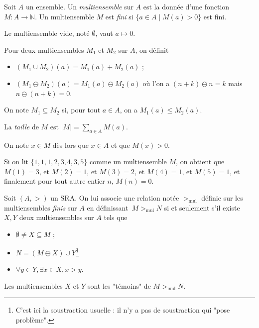 \documentclass[../main]{subfiles}
\begin{document}
  \begin{defn}
    Soit $A$ un ensemble. Un \textit{multiensemble} sur $A$ est la donnée d'une fonction $M : A \to \mathds{N}$.
    Un multiensemble $M$ est \textit{fini} si $\{a \in A  \mid M(a) > 0\}$ est fini.

    Le multiensemble vide, noté $\emptyset$, vaut $a \mapsto 0$.

    Pour deux multiensembles $M_1$ et $M_2$ sur $A$, on définit 
    \begin{itemize}
      \item  $(M_1 \cup M_2)(a) = M_1(a) + M_2(a)$ ;
      \item $(M_1 \ominus M_2)(a) = M_1(a) \ominus M_2(a)$ où l'on a $(n + k)\ominus n = k$ mais $n \ominus (n + k) = 0$.
    \end{itemize}

    On note $M_1 \subseteq M_2$ si, pour tout $a \in A$, on a $M_1(a) \le M_2(a)$.

    La \textit{taille} de $M$ est $|M| = \sum_{a \in A} M(a)$.

    On note $x \in M$ dès lors que $x \in A$ et que $M(x) > 0$.
  \end{defn}

  \begin{exm}
    Si on lit $\{1, 1, 1, 2, 3, 4, 3, 5\}$ comme un multiensemble $M$, on obtient que $M(1) = 3$, et $M(2) = 1$, et $M(3) = 2$, et $M(4) = 1$, et $M(5) = 1$, et finalement pour tout autre entier  $n$, $M(n) = 0$.
  \end{exm}

  \begin{defn}
    Soit $(A, >)$ un SRA.
    On lui associe une relation notée  $>_\mathrm{mul}$ définie sur les multiensembles \textit{finis} sur $A$ en définissant~$M >_\mathrm{mul} N$ si et seulement s'il existe $X,Y$ deux multiensembles sur $A$ tels que 
    \begin{itemize}
      \item $\emptyset \neq X \subseteq M$ ;
      \item $N = (M \ominus X) \cup Y$\footnote{C'est ici la soustraction usuelle : il n'y a pas de soustraction qui "pose problème".}
      \item $\forall  y \in Y, \exists x \in X, x > y$.
    \end{itemize}
  \end{defn}

  Les multiensembles $X$ et $Y$ sont les "témoins" de $M >_\mathrm{mul} N$.
\end{document}
